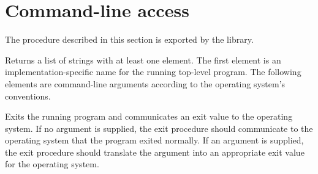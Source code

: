 \section{Command-line access}
\label{programlibsection}

The procedure described in this section is exported by the
 library.

\begin{entry}{%
}

Returns a list of strings with
at least one element.  The first element is an implementation-specific
name for the running top-level program.  The following elements are command-line
arguments according to the operating system's conventions.
\end{entry}

\begin{entry}{%
}

Exits the running program and communicates an exit value to the 
operating system.  If no argument is supplied, the {\cf exit}
procedure should communicate to the operating system that the program 
exited normally.  If an argument is supplied, the {\cf exit} procedure 
should translate the argument into an appropriate exit value for the 
operating system.
\end{entry}

